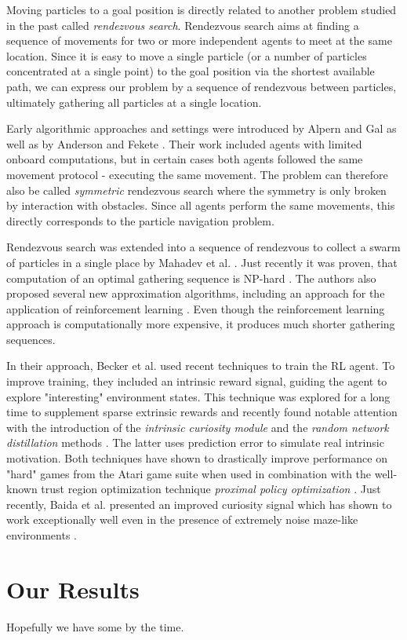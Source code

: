 Moving particles to a goal position is directly related to another problem studied in the past called \textit{rendezvous search}. Rendezvous search aims at finding a sequence of movements for two or more independent agents to meet at the same location. Since it is easy to move a single particle (or a number of particles concentrated at a single point) to the goal position via the shortest available path, we can express our problem by a sequence of rendezvous between particles, ultimately gathering all particles at a single location.

 Early algorithmic approaches and settings were introduced by Alpern and Gal \cite{alpern2006theory} as well as by Anderson and Fekete \cite{anderson2001two}. Their work included agents with limited onboard computations, but in certain cases both agents followed the same movement protocol - executing the same movement. The problem can therefore also be called \textit{symmetric} rendezvous search where the symmetry is only broken by interaction with obstacles. Since all agents perform the same movements, this directly corresponds to the particle navigation problem. 

Rendezvous search was extended into a sequence of rendezvous to collect a swarm of particles in a single place by Mahadev et al. \cite{mahadev2016collecting}. Just recently it was proven, that computation of an optimal gathering sequence is NP-hard \cite{becker2020}. The authors also proposed several new approximation algorithms, including an approach for the application of reinforcement learning \cite{huang2019, becker2020}. Even though the reinforcement learning approach is computationally more expensive, it produces much shorter gathering sequences.

In their approach, Becker et al. used recent techniques to train the RL agent. To improve training, they included an intrinsic reward signal, guiding the agent to explore "interesting" environment states. This technique was explored for a long time to supplement sparse extrinsic rewards \cite{pathak2017curiosity, mohamed2015variational, houthooft2016variational} and recently found notable attention with the introduction of the \textit{intrinsic curiosity module} \cite{burda2018large} and the \textit{random network distillation} methods \cite{burda2018exploration}. The latter uses prediction error to simulate real intrinsic motivation. Both techniques have shown to drastically improve performance on "hard" games from the Atari game suite when used in combination with the well-known trust region optimization technique \textit{proximal policy optimization} \cite{schulman2017proximal}. Just recently, Baida et al. presented an improved curiosity signal which has shown to work exceptionally well even in the presence of extremely noise maze-like environments \cite{badia2020never}.

\section{Our Results} \label{sec:Results}
Hopefully we have some by the time.